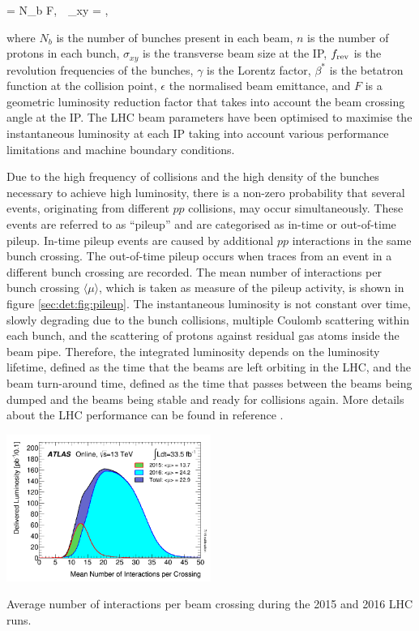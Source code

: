 \be
\lag = N_{b} \cdot F, \,\, \sigma_{xy} = \sqrt{\frac{\epsilon\beta^{*}}{\gamma}},
\label{sec:det:eq:lumi}
\ee

\noindent where $N_{b}$ is the number of bunches present in each beam, $n$ is the number of protons in each bunch, $\sigma_{xy}$ is the transverse beam size at the IP, $f_{\rm rev}$ is the revolution frequencies of the bunches, $\gamma$ is the Lorentz factor, $\beta^{*}$ is the betatron function at the collision point, $\epsilon$ the normalised beam emittance, and $F$ is a geometric luminosity reduction factor that takes into account the beam crossing angle at the IP. 
The LHC beam parameters have been optimised to maximise the instantaneous luminosity at each IP taking into account various performance limitations and machine boundary conditions.\par
Due to the high frequency of collisions and the high density of the bunches necessary to achieve high luminosity, there is a non-zero probability that several events, originating from different $pp$ collisions, may occur simultaneously. These events are referred to as ``pileup'' and are categorised as in-time or out-of-time pileup. In-time pileup events are caused by additional $pp$ interactions in the same bunch crossing. The out-of-time pileup occurs when traces from an event in a different bunch crossing are recorded. The mean number of interactions per bunch crossing $\langle\mu\rangle$, which is taken as measure of the pileup activity, is shown in figure \ref{sec:det:fig:pileup}. The instantaneous luminosity is not constant over time, slowly degrading due to the bunch collisions, multiple Coulomb scattering within each bunch, and the scattering of protons against residual gas atoms inside the beam pipe. Therefore, the integrated luminosity depends on the luminosity lifetime, defined as the time that the beams are left orbiting in the LHC, and the beam turn-around time, defined as the time that passes between the beams being dumped and the beams being stable and ready for collisions again. More details about the LHC performance can be found in reference \cite{Bruning:2004ej}.

\bfig[h!]
\centering
\includegraphics[width=0.5\textwidth]{figures/Detector/mu_2015_2016_LHCC.png}
\captionsetup{width=0.85\textwidth} \caption{\small Average number of interactions per beam crossing during the 2015 and 2016 LHC runs.}
\label{sec:det:fig:pileup}
\efig

